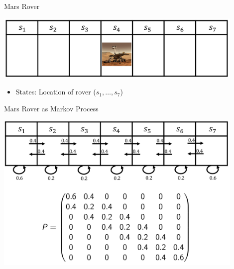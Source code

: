 \begin{frame}[c]{Mars Rover}
	
	\centering
	\includegraphics[width=0.9\textwidth]{images/mars_rover.png}
	
	\bigskip
	\begin{itemize}
		\item States: Location of rover ($s_1, \ldots, s_7$)
	\end{itemize}
	
\end{frame}
\begin{frame}[c]{Mars Rover as Markov Process}
	
	\centering
	\includegraphics[width=0.9\textwidth]{images/mars_rover_markov_process.png}
	
	
\end{frame}
